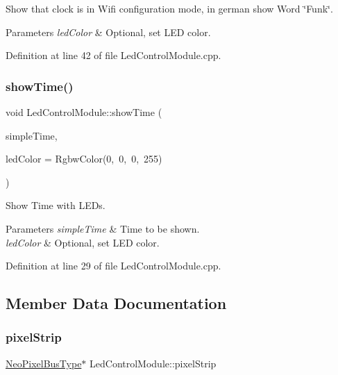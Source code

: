 Show that clock is in Wifi configuration mode, in german show Word \char`\"{}\+Funk\char`\"{}. 
\begin{DoxyParams}{Parameters}
{\em led\+Color} & Optional, set L\+ED color. \\
\hline
\end{DoxyParams}


Definition at line 42 of file Led\+Control\+Module.\+cpp.

\mbox{\label{class_led_control_module_a873a4c44c95a7da2ca0665b0e69cf392}} 
\subsubsection{\texorpdfstring{showTime()}{showTime()}}
{\footnotesize\ttfamily void Led\+Control\+Module\+::show\+Time (\begin{DoxyParamCaption}\item[{const \mbox{\hyperlink{class_simple_time}{Simple\+Time}} \&}]{simple\+Time,  }\item[{const Rgbw\+Color \&}]{led\+Color = {\ttfamily RgbwColor(0,~0,~0,~255)} }\end{DoxyParamCaption})}

Show Time with L\+E\+Ds. 
\begin{DoxyParams}{Parameters}
{\em simple\+Time} & Time to be shown. \\
\hline
{\em led\+Color} & Optional, set L\+ED color. \\
\hline
\end{DoxyParams}


Definition at line 29 of file Led\+Control\+Module.\+cpp.



\subsection{Member Data Documentation}
\mbox{\label{class_led_control_module_a9d427e447c0cfb34b154f464e7682e14}} 
\subsubsection{\texorpdfstring{pixelStrip}{pixelStrip}}
{\footnotesize\ttfamily \mbox{\hyperlink{_led_control_module_8h_a51a7b766d62733fca1ec20e82e024f9f}{Neo\+Pixel\+Bus\+Type}}$\ast$ Led\+Control\+Module\+::pixel\+Strip\hspace{0.3cm}{\ttfamily [private]}}



